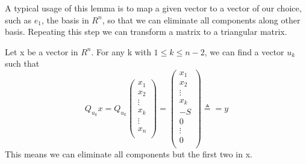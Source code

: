 A typical usage of this lemma is to map a given vector to a vector of our choice, such as $e_1$, the basis in $R^n$, so that we can eliminate all components along other basis. Repeating this step we can transform a matrix to a triangular matrix.

\begin{lem}
Let x be a vector in $R^n$. For any k with $1 \leq k \leq n-2$, we can find a vector $u_k$ such that
\[Q_{u_k}x = Q_{u_k}
\left( \begin{array}{c} x_1\\ x_2\\ \vdots\\ x_k\\ \vdots\\ x_n\\ \end{array} \right) = 
\left( \begin{array}{c} x_1\\ x_2\\ \vdots\\ x_k\\ -S\\ 0\\ \vdots\\ 0\\ \end{array} \right)
\triangleq = y
\]
This means we can eliminate all components but the first two in x.
\end{lem}
